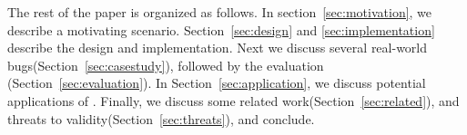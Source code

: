 \begin{itemize}[leftmargin=*,topsep=0pt,itemsep=-1ex,partopsep=1ex,parsep=1ex]
\end{itemize}


\noindent
The rest of the paper is organized as follows.
In section~\ref{sec:motivation}, we describe a motivating scenario.
Section~\ref{sec:design} and \ref{sec:implementation} describe the design and implementation.
Next we discuss several real-world bugs(Section~\ref{sec:casestudy}), followed by the evaluation (Section~\ref{sec:evaluation}).
In Section~\ref{sec:application}, we discuss potential applications of \parikshan. 
Finally, we discuss some related work(Section~\ref{sec:related}), and threats to validity(Section~\ref{sec:threats}), and conclude.


%
